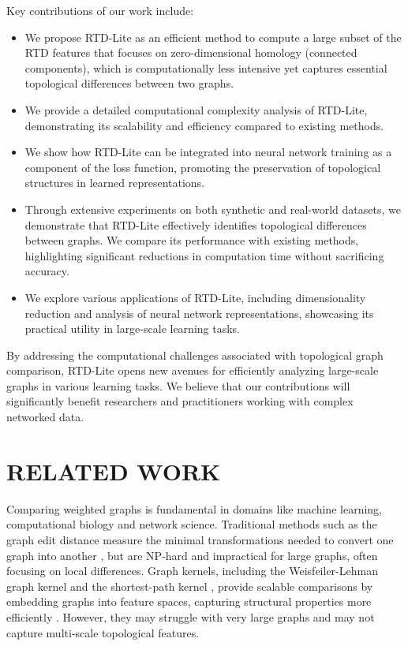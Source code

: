\documentclass[twoside]{article}
\begin{document}
Key contributions of our work include:
\begin{itemize}
    \item  We propose RTD-Lite as an efficient method to compute a large subset of the RTD features that focuses on zero-dimensional homology (connected components), which is computationally less intensive yet captures essential topological differences between two graphs.

    \item We provide a detailed computational complexity analysis of RTD-Lite, demonstrating its scalability and efficiency compared to existing methods.

    \item We show how RTD-Lite can be  integrated into neural network training as a component of the loss function, promoting the preservation of topological structures in learned representations.

    \item Through extensive experiments on both synthetic and real-world datasets, we demonstrate that RTD-Lite effectively identifies topological differences between graphs. We compare its performance with existing methods, highlighting significant reductions in computation time without sacrificing accuracy.

    \item We explore various applications of RTD-Lite, including dimensionality reduction and analysis of neural network representations, showcasing its practical utility in large-scale learning tasks.
\end{itemize}


By addressing the computational challenges associated with topological graph comparison, RTD-Lite opens new avenues for efficiently analyzing large-scale graphs in various learning tasks. We believe that our contributions will significantly benefit researchers and practitioners working with complex networked data.

\section{RELATED WORK}
\label{sec:related_work}

Comparing weighted graphs is fundamental in domains like machine learning, computational biology and network science.  Traditional methods such as the graph edit distance measure the minimal transformations needed to convert one graph into another \citep{Sanfeliu1983GraphDistance}, but are NP-hard and impractical for large graphs, often focusing on local differences.
Graph kernels, including the Weisfeiler-Lehman graph kernel \citep{Shervashidze2011WeisfeilerLehman} and the shortest-path kernel \citep{Borgwardt2005ShortestPathKernel}, provide scalable comparisons by embedding graphs into feature spaces, capturing structural properties more efficiently \citep{vishwanathan10a}. However, they may struggle with very large graphs and may not capture multi-scale topological features.
\end{document}
